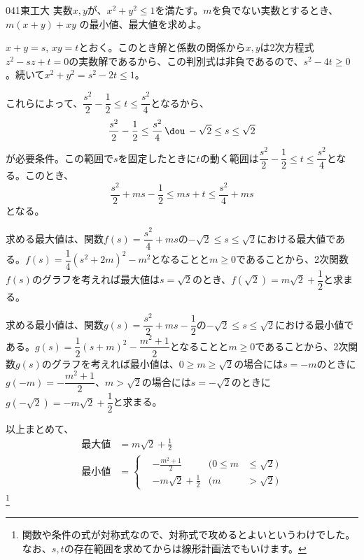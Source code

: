 \begin{prob}{041}{}{東工大}
 実数$x,y$が、$x^2+y^2\le 1$を満たす。$m$を負でない実数とするとき、$m(x+y)+xy$ の最小値、最大値を求めよ。
\end{prob}

$x+y=s$, $xy=t$とおく。このとき解と係数の関係から$x, y$は2次方程式$z^2-sz+t=0$の実数解であるから、この判別式は非負であるので、$s^2-4t\ge 0$。続いて$x^2+y^2=s^2-2t\le 1$。

これらによって、$\dfrac{s^2}{2}-\dfrac{1}{2}\le t\le \dfrac{s^2}{4}$となるから、
\[ \frac{s^2}{2}-\frac{1}{2}\le \frac{s^2}{4} \,\dou\, -\sqrt{2}\le s\le \sqrt{2} \]
が必要条件。この範囲で$s$を固定したときに$t$の動く範囲は$\dfrac{s^2}{2}-\dfrac{1}{2}\le t\le \dfrac{s^2}{4}$となる。このとき、
\[ \frac{s^2}{2}+ms-\frac{1}{2}\le ms+t\le \frac{s^2}{4}+ms \]
となる。

求める最大値は、関数$f(s)=\dfrac{s^2}{4}+ms$の$-\sqrt{2}\le s\le\sqrt{2}$における最大値である。$f(s)=\dfrac{1}{4}(s^2+2m)^2-m^2$となることと$m\ge 0$であることから、2次関数$f(s)$のグラフを考えれば最大値は$s=\sqrt{2}$のとき、$f(\sqrt{2})=m\sqrt{2}+\dfrac{1}{2}$と求まる。

求める最小値は、関数$g(s)=\dfrac{s^2}{2}+ms-\dfrac{1}{2}$の$-\sqrt{2}\le s\le \sqrt{2}$における最小値である。$g(s)=\dfrac{1}{2}(s+m)^2-\dfrac{m^2+1}{2}$となることと$m\ge 0$であることから、2次関数$g(s)$のグラフを考えれば最小値は、$0\ge m\ge\sqrt{2}$の場合には$s=-m$のときに$g(-m)=-\dfrac{m^2+1}{2}$、$m>\sqrt{2}$の場合には$s=-\sqrt{2}$のときに$g(-\sqrt{2})=-m\sqrt{2}+\dfrac{1}{2}$と求まる。

以上まとめて、
\begin{align*}
 \text{最大値}&=m\sqrt{2}+\frac{1}{2} \\
 \text{最小値}&=\left\{
 \begin{aligned}
  &-\frac{m^2+1}{2}  & (0\le m&\le\sqrt{2}) \\
  &-m\sqrt{2}+\frac{1}{2} & (m&>\sqrt{2})
 \end{aligned} \right.
\end{align*}
\footnote{関数や条件の式が対称式なので、対称式で攻めるとよいというわけでした。なお、$s, t$の存在範囲を求めてからは線形計画法でもいけます。}